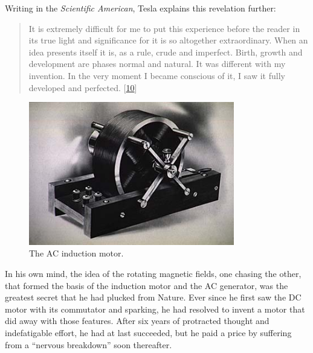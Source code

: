 \documentclass[
  a4paper,
]{article}
\begin{document}
Writing in the \emph{Scientific American}, Tesla explains this
revelation further:

\begin{quote}
It is extremely difficult for me to put this experience before the
reader in its true light and significance for it is so altogether
extraordinary. When an idea presents itself it is, as a rule, crude and
imperfect. Birth, growth and development are phases normal and natural.
It was different with my invention. In the very moment I became
conscious of it, I saw it fully developed and perfected.
{[}\protect\hyperlink{ref-tesla-personal}{10}{]}
\end{quote}

\begin{figure}
\hypertarget{fig:ac-motor}{%
\centering
\includegraphics[width=0.8\textwidth,height=\textheight]{images/acmot_main02.jpg}
\caption[The AC induction motor.]{The AC induction
motor.\footnotemark{}}\label{fig:ac-motor}
}
\end{figure}

In his own mind, the idea of the rotating magnetic fields, one chasing
the other, that formed the basis of the induction motor and the AC
generator, was the greatest secret that he had plucked from Nature. Ever
since he first saw the DC motor with its commutator and sparking, he had
resolved to invent a motor that did away with those features. After six
years of protracted thought and indefatigable effort, he had at last
succeeded, but he paid a price by suffering from a ``nervous breakdown''
soon thereafter.
\end{document}
